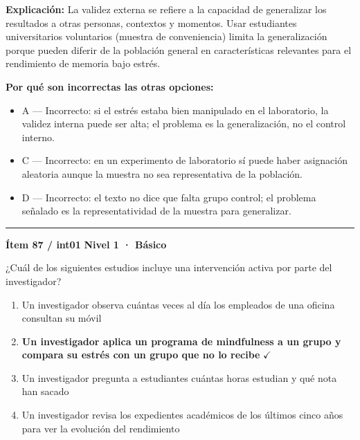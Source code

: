 \documentclass[12pt,a4paper]{article}
\begin{document}
\noindent\textbf{\color{azul}Explicación:} La validez externa se refiere a la capacidad de generalizar los resultados a otras personas, contextos y momentos. Usar estudiantes universitarios voluntarios (muestra de conveniencia) limita la generalización porque pueden diferir de la población general en características relevantes para el rendimiento de memoria bajo estrés.

\noindent\textbf{\color{gris}Por qué son incorrectas las otras opciones:}
\begin{itemize}
  \item {\small A — Incorrecto: si el estrés estaba bien manipulado en el laboratorio, la validez interna puede ser alta; el problema es la generalización, no el control interno.}
  \item {\small C — Incorrecto: en un experimento de laboratorio sí puede haber asignación aleatoria aunque la muestra no sea representativa de la población.}
  \item {\small D — Incorrecto: el texto no dice que falta grupo control; el problema señalado es la representatividad de la muestra para generalizar.}
\end{itemize}
\vspace{8pt}\hrule\vspace{10pt}

\begin{mdframed}[backgroundcolor=fondogris,linecolor=azul,linewidth=1pt,innerleftmargin=10pt,innerrightmargin=10pt,innertopmargin=7pt,innerbottommargin=7pt]
\textbf{Ítem 87 / int01} \hfill {\small\bfseries\color{azul} Nivel 1 · Básico}
\end{mdframed}

¿Cuál de los siguientes estudios incluye una intervención activa por parte del investigador?

\begin{enumerate}
  \item[A.] Un investigador observa cuántas veces al día los empleados de una oficina consultan su móvil
  \item[\textbf{\color{verde}B.}] \textbf{\color{verde} Un investigador aplica un programa de mindfulness a un grupo y compara su estrés con un grupo que no lo recibe} \hfill $\checkmark$
  \item[C.] Un investigador pregunta a estudiantes cuántas horas estudian y qué nota han sacado
  \item[D.] Un investigador revisa los expedientes académicos de los últimos cinco años para ver la evolución del rendimiento
\end{enumerate}
\end{document}
